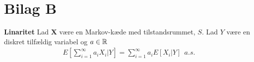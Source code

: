\section{Bilag B}\label{bilag:linaritet}
\begin{minipage}\textwidth
\begin{thmx} \textbf{Linaritet} %
\newline
Lad $\bm X$ være en Markov-kæde med tilstandsrummet, $S$. Lad $Y$ være en diskret tilfældig variabel og $a\in \mathbb{R}$
\begin{align*}
    E\left[\sum_{i=1}^\infty a_i X_i | Y\right] =  \sum_{i=1}^\infty a_i E\left[X_i |Y\right] \ \ a.s.
\end{align*}
\end{thmx}
\end{minipage}
